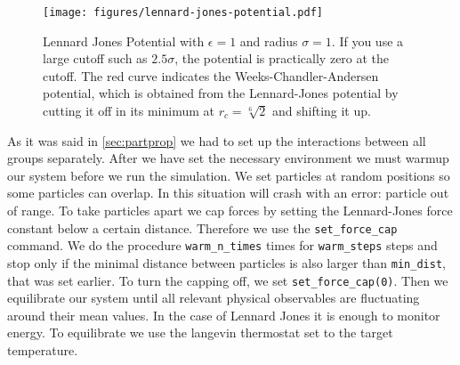 \documentclass[
paper=a4,                       %
fontsize=11pt,                  %
twoside,                        %
footsepline,                    %
headsepline,                    %
headinclude=false,              %
footinclude=false,              %
pagesize,                       %
]{scrartcl}
\newtheorem{task}{Task}
\begin{document}
   \vspace{1cm}\vspace{1cm}

\begin{figure}[ht]
\begin{center}
\texttt{[image: figures/lennard-jones-potential.pdf]}
\caption[long text]{Lennard Jones Potential with
  $\epsilon=1$ and radius $\sigma=1$. If you use a large cutoff such as
  $2.5\sigma$, the potential is practically zero at the cutoff. The
  red curve indicates the Weeks-Chandler-Andersen potential, which
  is obtained from the Lennard-Jones potential by cutting it off in
  its minimum at $r_c=\sqrt[6]{2}$ and shifting it up.}
\label{pic:lennard-jones}
\end{center}
\end{figure}

As it was said in \ref{sec:partprop} we had to set up the interactions between all groups separately. 
After we have set the necessary environment we must warmup our system before we run the simulation. We set 
particles at random positions so some particles can overlap. In this situation \es  will crash with an error:
particle out of range. To take particles apart 
we cap forces  by setting the Lennard-Jones force constant below a certain distance. 
Therefore we use the \lstinline|set_force_cap| command. We do the procedure  \verb"warm_n_times" times 
for \verb"warm_steps" steps and stop only if the minimal distance between particles is also larger than 
\verb"min_dist", that was set earlier.  To turn 
the capping off, we set \verb|set_force_cap(0)|. Then  we equilibrate our system
until all relevant physical observables are fluctuating around their mean values. In
the case of Lennard Jones it is enough to monitor energy.  To equilibrate we use the
langevin thermostat set to the target temperature.
\end{document}
